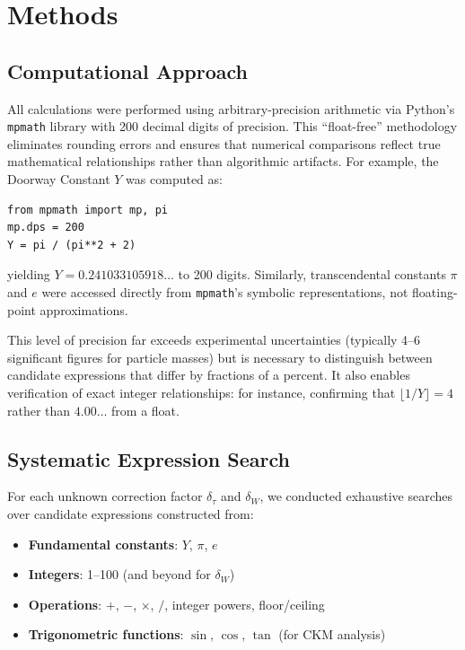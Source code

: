 \documentclass[11pt,a4paper]{article}
\begin{document}
\section{Methods}

\subsection{Computational Approach}

All calculations were performed using arbitrary-precision arithmetic via Python's \texttt{mpmath} library with 200 decimal digits of precision. This ``float-free'' methodology eliminates rounding errors and ensures that numerical comparisons reflect true mathematical relationships rather than algorithmic artifacts. For example, the Doorway Constant $Y$ was computed as:
\begin{verbatim}
from mpmath import mp, pi
mp.dps = 200
Y = pi / (pi**2 + 2)
\end{verbatim}
yielding $Y = 0.241033105918\ldots$ to 200 digits. Similarly, transcendental constants $\pi$ and $e$ were accessed directly from \texttt{mpmath}'s symbolic representations, not floating-point approximations.

This level of precision far exceeds experimental uncertainties (typically 4--6 significant figures for particle masses) but is necessary to distinguish between candidate expressions that differ by fractions of a percent. It also enables verification of exact integer relationships: for instance, confirming that $\lfloor 1/Y \rfloor = 4$ rather than $4.00\ldots$ from a float.

\subsection{Systematic Expression Search}

For each unknown correction factor $\delta_\tau$ and $\delta_W$, we conducted exhaustive searches over candidate expressions constructed from:
\begin{itemize}
\item \textbf{Fundamental constants}: $Y$, $\pi$, $e$
\item \textbf{Integers}: 1--100 (and beyond for $\delta_W$)
\item \textbf{Operations}: $+$, $-$, $\times$, $/$, integer powers, floor/ceiling
\item \textbf{Trigonometric functions}: $\sin$, $\cos$, $\tan$ (for CKM analysis)
\end{itemize}
\end{document}

